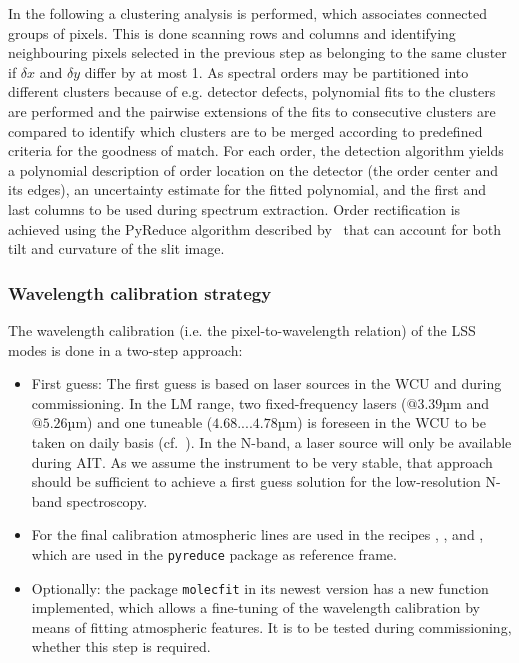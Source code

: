 In the following a clustering analysis is performed, which associates connected groups of pixels. This is done scanning rows and columns and identifying neighbouring pixels selected in the previous step as belonging to the same cluster if $\delta x$ and $\delta y$ differ by at most 1. As spectral orders may be partitioned into different clusters because of e.g. detector defects, polynomial fits to the clusters are performed and the pairwise extensions of the fits to consecutive clusters are compared to identify which clusters are to be merged according to predefined criteria for the goodness of match. For each order, the detection algorithm yields a polynomial description of order location on the detector (the order center and its edges), an uncertainty estimate
for the fitted polynomial, and the first and last columns to be used during spectrum extraction. 
Order rectification is achieved using the PyReduce algorithm described by~\cite{pis21} that can account for both tilt and curvature of the slit image.   

\subsubsection{Wavelength calibration strategy}\label{ssec:wavecal}
The wavelength calibration (i.e. the pixel-to-wavelength relation) of the \ac{LSS} modes is done in a two-step approach:
\begin{itemize}
    \item First guess: The first guess is based on laser sources in the \ac{WCU} and during commissioning.  In the LM range, two fixed-frequency lasers ($@3.39$µm and $@5.26$µm) and one tuneable ($4.68....4.78$µm) is foreseen in the \ac{WCU} to be taken on daily basis (cf.~\cite{METIS-calibration_plan}). In the N-band, a laser source will only be available during \ac{AIT}. As we assume the instrument to be very stable, that approach should be sufficient to achieve a first guess solution for the low-resolution N-band spectroscopy.
    \item For the final calibration atmospheric lines are used in the recipes ,  ,  and , which are used in the \texttt{pyreduce} package as reference frame.
    \item Optionally: the package \texttt{molecfit} in its newest version has a new function implemented, which allows a fine-tuning of the wavelength calibration by means of fitting atmospheric features. It is to be tested during commissioning, whether this step is required.
\end{itemize}

